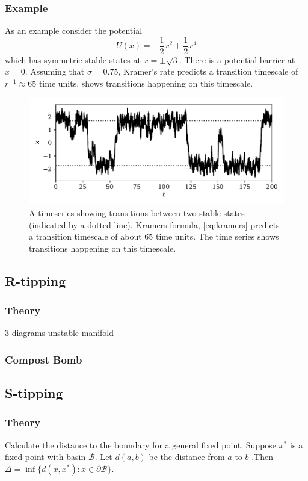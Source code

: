 \subsubsection{Example}
As an example consider the potential
\begin{equation}
  \label{eq:example_potential}
  U(x) = -\frac{1}{2}x^2 + \frac{1}{2}x^4
\end{equation}
which has symmetric stable states at $x = \pm \sqrt{3}$. There is a potential barrier at $x = 0$. Assuming that $\sigma = 0.75$, Kramer's rate predicts a transition
timescale of $r^{-1} \approx 65$ time units.  shows transitions happening on this timescale.

\begin{figure}
  \centering
  \includegraphics[width=\textwidth,keepaspectratio]{noise_trans}
  \caption[An example of N-tipping]{A timeseries showing transitions between two stable states (indicated by a dotted line). Kramers formula, \cref{eq:kramers} predicts a
    transition timescale of about $65$ time units. The time series shows transitions happening on this timescale.}
  \label{fig:ntipping}
\end{figure}


\subsection{R-tipping}
\subsubsection{Theory}
3 diagrams unstable manifold
\subsubsection{Compost Bomb}
\subsection{S-tipping}
\subsubsection{Theory}
Calculate the distance to the boundary for a general fixed point. Suppose $x^*$ is a fixed point with basin $\mathcal{B}$. Let $d(a,b)$ be the distance from
$a$ to $b$ .Then $\Delta = \inf \{d(x,x^*) : x \in \partial\mathcal{B}\}$.
